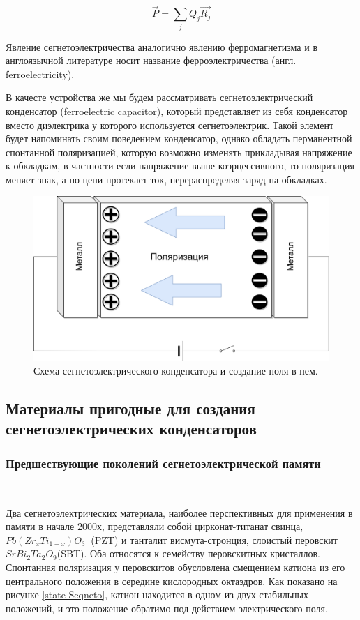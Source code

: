 \documentclass[a4paper,12pt]{article} %
\begin{document}
$$ \vec{P} = \sum_{j}Q_j\vec{R_j}   $$

Явление сегнетоэлектричества аналогично явлению ферромагнетизма и в англоязычной литературе носит название ферроэлектричества (англ. ferroelectricity). 


В качесте устройства же мы будем рассматривать сегнетоэлектрический конденсатор (ferroelectric capacitor), который представляет из себя конденсатор вместо диэлектрика у которого используется сегнетоэлектрик. Такой элемент будет напоминать своим поведением конденсатор, однако обладать перманентной спонтанной поляризацией, которую возможно изменять прикладывая напряжение к обкладкам, в частности если напряжение выше коэрцессивного, то поляризация меняет знак, а по цепи протекает ток, перераспределяя заряд на обкладках.

\begin{figure}
  \includegraphics[width=\linewidth]{FRAM-Page-4.png}
  \caption{Схема сегнетоэлектрического конденсатора и создание поля в нем.}
  \label{FerroCap}
\end{figure}





\subsection{Материалы пригодные для создания сегнетоэлектрических конденсаторов}


\subsubsection{Предшествующие поколений сегнетоэлектрической памяти}\

Два сегнетоэлектрических материала, наиболее перспективных для применения в памяти в начале 2000х, представляли собой цирконат-титанат свинца, $Pb (Zr_x Ti_{1-x}) O_3 \ $ (PZT) и танталит висмута-стронция, слоистый перовскит$ SrBi_2Ta_2O_9 $(SBT). Оба относятся к семейству перовскитных кристаллов. Спонтанная поляризация у перовскитов обусловлена смещением катиона из его центрального положения в середине кислородных октаэдров. Как показано на рисунке \eqref{state-Seqneto}, катион находится в одном из двух стабильных положений, и это положение обратимо под действием электрического поля.
\end{document}
